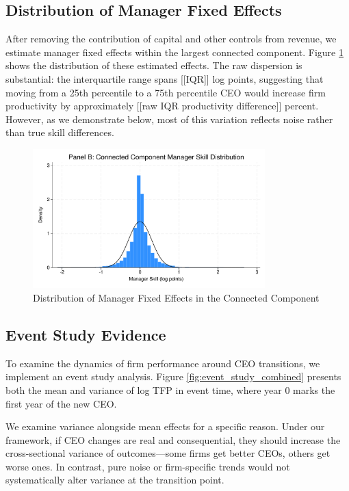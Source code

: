 \documentclass[11pt,a4paper]{article}
\begin{document}
\subsection{Distribution of Manager Fixed Effects}

After removing the contribution of capital and other controls from revenue, we estimate manager fixed effects within the largest connected component. Figure \ref{fig:manager_distribution} shows the distribution of these estimated effects. The raw dispersion is substantial: the interquartile range spans [[IQR]] log points, suggesting that moving from a 25th percentile to a 75th percentile CEO would increase firm productivity by approximately [[raw IQR productivity difference]] percent. However, as we demonstrate below, most of this variation reflects noise rather than true skill differences.

\begin{figure}[htbp]
\centering
\includegraphics[width=0.8\textwidth]{figure/manager_skill_connected.pdf}
\caption{Distribution of Manager Fixed Effects in the Connected Component}
\label{fig:manager_distribution}
\end{figure}

\subsection{Event Study Evidence}

To examine the dynamics of firm performance around CEO transitions, we implement an event study analysis. Figure \ref{fig:event_study_combined} presents both the mean and variance of log TFP in event time, where year 0 marks the first year of the new CEO.

We examine variance alongside mean effects for a specific reason. Under our framework, if CEO changes are real and consequential, they should increase the cross-sectional variance of outcomes—some firms get better CEOs, others get worse ones. In contrast, pure noise or firm-specific trends would not systematically alter variance at the transition point.
\end{document}
